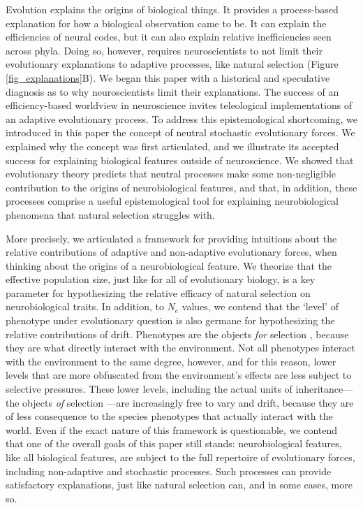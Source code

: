 \documentclass[twocolumn]{article}
\begin{document}
Evolution explains the origins of biological things. It provides a process-based explanation for how a biological observation came to be. It can explain the efficiencies of neural codes, but it can also explain relative inefficiencies seen across phyla. Doing so, however, requires neuroscientists to not limit their evolutionary explanations to adaptive processes, like natural selection (Figure \ref{fig_explanations}B). We began this paper with a historical and speculative diagnosis as to why neuroscientists limit their explanations. The success of an efficiency-based worldview in neuroscience invites teleological implementations of an adaptive evolutionary process. To address this epistemological shortcoming, we introduced in this paper the concept of neutral stochastic evolutionary forces. We explained why the concept was first articulated, and we illustrate its accepted success for explaining biological features outside of neuroscience. We showed that evolutionary theory predicts that neutral processes make some non-negligible contribution to the origins of neurobiological features, and that, in addition, these processes comprise a useful epistemological tool for explaining neurobiological phenomena that natural selection struggles with. 

More precisely, we articulated a framework for providing intuitions about the relative contributions of adaptive and non-adaptive evolutionary forces, when thinking about the origins of a neurobiological feature. We theorize that the effective population size, just like for all of evolutionary biology, is a key parameter for hypothesizing the relative efficacy of natural selection on neurobiological traits. In addition, to $N_e$ values, we contend that the `level' of phenotype under evolutionary question is also germane for hypothesizing the relative contributions of drift. Phenotypes are the objects \textit{for} selection \cite{mayr_1997, sober1993nature}, because they are what directly interact with the environment. Not all phenotypes interact with the environment to the same degree, however, and for this reason, lower levels that are more obfuscated from the environment's effects are less subject to selective pressures. These lower levels, including the actual units of inheritance---the objects \textit{of} selection \cite{mayr_1997, sober1993nature}---are increasingly free to vary and drift, because they are of less consequence to the species phenotypes that actually interact with the world. Even if the exact nature of this framework is questionable, we contend that one of the overall goals of this paper still stands: neurobiological features, like all biological features, are subject to the full repertoire of evolutionary forces, including non-adaptive and stochastic processes. Such processes can provide satisfactory explanations, just like natural selection can, and in some cases, more so. 
\end{document}
